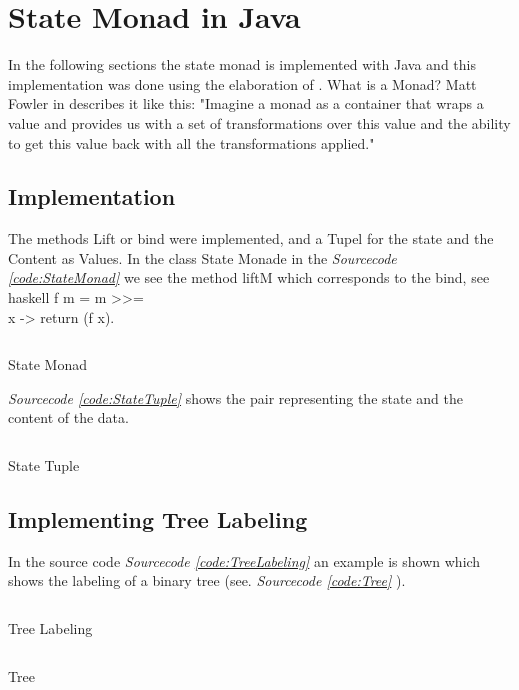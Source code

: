 \documentclass[a4paper,12pt,twoside]{scrreprt}
\begin{document}
\section{State Monad in Java}
In the following sections the state monad is implemented with Java and this implementation was done using the elaboration of \cite{muzietto_state_2014}.
\newline
What is a Monad? 
Matt Fowler in \cite{fowler_understanding_2015} describes it like this:
"Imagine a monad as a container that wraps a value and provides us with a set of transformations over this value and the ability to get this value back with all the transformations applied."

\subsection{Implementation}
The methods Lift or bind were implemented, and a Tupel for the state and the Content as Values.
In the class State Monade in the  \emph{Sourcecode \ref{code:StateMonad}} we see the method liftM which corresponds to the bind, see haskell f m = m >>= \\x -> return (f x).
\begin{listing}[ht]
    \inputminted[fontsize=\footnotesize,linenos]{java}{./code/StateMonad.java}
    \caption[State Monad]{State Monad}
    \label{code:StateMonad}
\end{listing}
\clearpage

\emph{Sourcecode \ref{code:StateTuple}} shows the pair representing the state and the content of the data.
\begin{listing}[ht]
    \inputminted[fontsize=\footnotesize,linenos]{java}{./code/StateTuple.java}
    \caption[State Tuple]{State Tuple}
    \label{code:StateTuple}
\end{listing}
\clearpage

\subsection{Implementing Tree Labeling}
In the source code \emph{Sourcecode \ref{code:TreeLabeling}} an example is shown which shows the labeling of a binary tree (see. \emph{Sourcecode \ref{code:Tree}} ).
\begin{listing}[ht]
    \inputminted[fontsize=\footnotesize,linenos]{java}{./code/Labeling.java}
    \caption[Tree Labeling]{Tree Labeling}
    \label{code:TreeLabeling}
\end{listing}
\clearpage

\begin{listing}[ht]
    \inputminted[fontsize=\footnotesize,linenos]{java}{./code/Tree.java}
    \caption[Tree]{Tree}
    \label{code:Tree}
\end{listing}
\clearpage

\clearpage
{}
{}
\printbibliography
\end{document}
